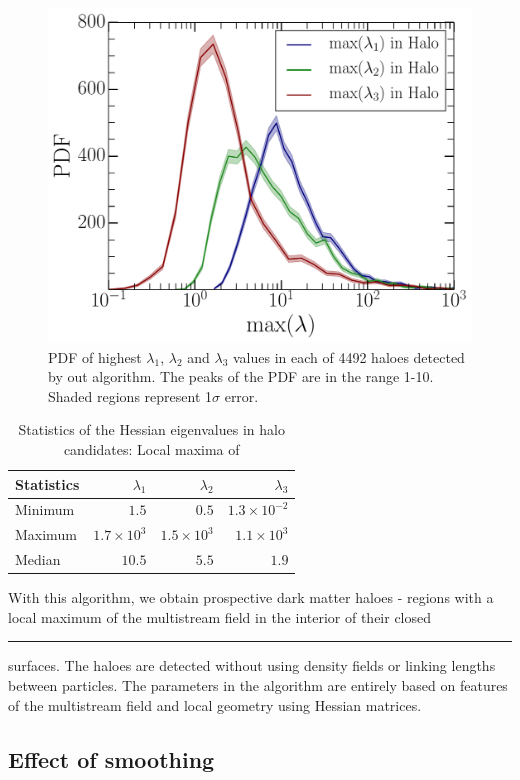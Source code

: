 \documentclass[fleqn,usenatbib,useAMS]{mnras}
\newcommand\hl{\bgroup\markoverwith
  {\textcolor{yellow}{\rule[-.5ex]{2pt}{2.5ex}}}\ULon}
\begin{document}
{\begin{figure}
\begin{minipage}[t]{.99\linewidth}
 \centering\includegraphics[width=8.cm]{fig4.pdf} 
\end{minipage}\hfill
\caption{PDF of highest $\lambda_1$, $\lambda_2$ and $\lambda_3$ values in each of 4492 haloes detected by out algorithm. The peaks of the PDF are in the range 1-10. Shaded regions represent 1$\sigma$ error. }
\label{fig:maxL3}
\end{figure}

\begin{table}
  \caption{Statistics of the Hessian eigenvalues in halo candidates: Local maxima of}
\begin{tabular}{|l|r|r|r|}
\hline
Statistics                &  $\lambda_1$ &  $\lambda_2$ &  $\lambda_3$\\ \hline
Minimum   & $ 1.5 $ & $ 0.5 $ & $ 1.3 \times 10^{-2} $  \\ \hline
Maximum  & $1.7 \times 10^3$  & $1.5 \times 10^3$ & $1.1 \times 10^3$     \\ \hline
Median     & $10.5$  & $5.5$ & $1.9$  \\ \hline
\end{tabular}
\label{tab:maxL3}
\end{table}

 
With this algorithm, we obtain prospective dark matter haloes - regions with a local maximum of the multistream field in the interior of their closed \hl{convex} surfaces. The haloes are detected without using density fields or linking lengths between particles. The parameters in the algorithm are entirely based on features of the multistream field and local geometry using Hessian matrices. 


\subsection{Effect of smoothing}
\label{sub:Smooth}

}
\end{document}
